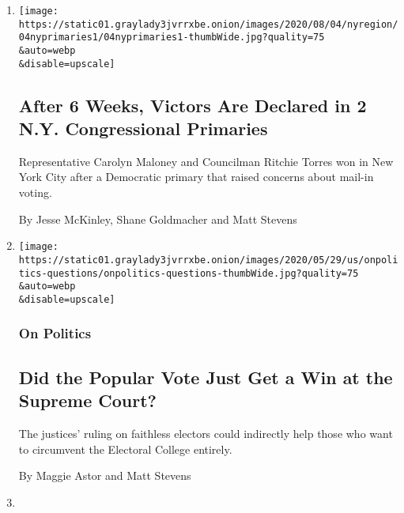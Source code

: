 \begin{enumerate}
\def\labelenumi{\arabic{enumi}.}
\item
  \href{/2020/08/04/nyregion/maloney-torres-ny-congressional-races.html}{}

  \texttt{[image: https://static01.graylady3jvrrxbe.onion/images/2020/08/04/nyregion/04nyprimaries1/04nyprimaries1-thumbWide.jpg?quality=75\\\&auto=webp\\\&disable=upscale]}

  \hypertarget{after-6-weeks-victors-are-declared-in-2-ny-congressional-primaries}{%
  \subsection{After 6 Weeks, Victors Are Declared in 2 N.Y.
  Congressional
  Primaries}\label{after-6-weeks-victors-are-declared-in-2-ny-congressional-primaries}}

  Representative Carolyn Maloney and Councilman Ritchie Torres won in
  New York City after a Democratic primary that raised concerns about
  mail-in voting.

  By Jesse McKinley, Shane Goldmacher and Matt Stevens
\item
  \href{/2020/07/06/us/politics/supreme-court-popular-vote.html}{}

  \texttt{[image: https://static01.graylady3jvrrxbe.onion/images/2020/05/29/us/onpolitics-questions/onpolitics-questions-thumbWide.jpg?quality=75\\\&auto=webp\\\&disable=upscale]}

  \hypertarget{on-politics}{%
  \subsubsection{On Politics}\label{on-politics}}

  \hypertarget{did-the-popular-vote-just-get-a-win-at-the-supreme-court}{%
  \subsection{Did the Popular Vote Just Get a Win at the Supreme
  Court?}\label{did-the-popular-vote-just-get-a-win-at-the-supreme-court}}

  The justices' ruling on faithless electors could indirectly help those
  who want to circumvent the Electoral College entirely.

  By Maggie Astor and Matt Stevens
\item
  \href{/2020/06/30/us/politics/biden-speech-trump-coronavirus.html}{}


\end{enumerate}
